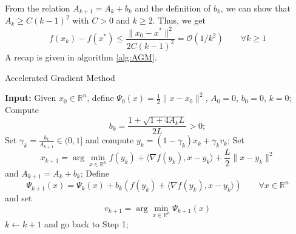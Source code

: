 \documentclass[12pt, openany]{report}
\newcommand{\R}{\mathbb{R}}
\theoremstyle{definition}
\begin{document}
From the relation $A_{k+1} = A_k + b_k$ and the definition of $b_k$, we can show that $A_k\ge C(k-1)^2$ with $C>0$ and $k\ge2$. Thus, we get 
\begin{equation}
	f(x_k) - f(x^*) \le \frac{\|x_0-x^*\|^2}{2C(k-1)^2} = \mathcal{O}(1/k^2) \qquad \forall k\ge1
\end{equation}
A recap is given in algorithm \ref{alg:AGM}.\\
\begin{algorithm}[H]
	\caption{Accelerated Gradient Method}
	\label{alg:AGM}
	\begin{algorithmic}[1]
		\State \textbf{Input:} Given $x_0 \in \R^n$, define $\Psi_0(x)=\frac{1}{2}\|x-x_0\|^2$, $A_0=0$, $b_0=0$, $k=0$;
		\State Compute 
		\begin{equation}
			b_k = \frac{1+\sqrt{1+4A_kL}}{2L}>0;
		\end{equation}
		\State Set $\gamma_k = \frac{b_k}{A_{k+1}}\in (0,1]$ and compute $y_k = (1-\gamma_k)x_k + \gamma_k v_k$;
		\State Set 
		\begin{equation}
			x_{k+1} = \arg\min_{x \in \R^n} f(y_k) + \langle \nabla f(y_k),x-y_k\rangle + \frac{L}{2}\|x-y_k\|^2
		\end{equation}
		and $A_{k+1} = A_k + b_k$;
		\State Define 
		\begin{equation}
			\Psi_{k+1}(x) = \Psi_k(x) + b_k \left(f(y_k)+\langle \nabla f(y_k),x-y_k\rangle \right) \qquad \forall x \in \R^n
		\end{equation}
		and set 
		\begin{equation}
			v_{k+1} = \arg\min_{x \in \R^n} \Psi_{k+1}(x)
		\end{equation}
		\State $k \gets k+1$ and go back to Step 1;
	\end{algorithmic}
\end{algorithm}
\end{document}

